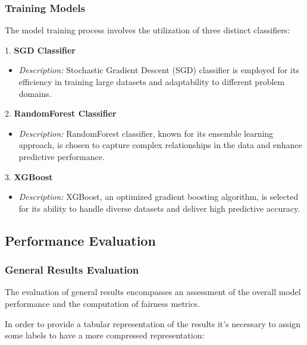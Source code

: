 \subsubsection{Training Models}

The model training process involves the utilization of three distinct classifiers:

1. \textbf{SGD Classifier}
   \begin{itemize}
       \item \textit{Description:} Stochastic Gradient Descent (SGD) classifier is employed for its efficiency in training large datasets and adaptability to different problem domains.
   \end{itemize}

2. \textbf{RandomForest Classifier}
   \begin{itemize}
       \item \textit{Description:} RandomForest classifier, known for its ensemble learning approach, is chosen to capture complex relationships in the data and enhance predictive performance.
   \end{itemize}

3. \textbf{XGBoost}
   \begin{itemize}
       \item \textit{Description:} XGBoost, an optimized gradient boosting algorithm, is selected for its ability to handle diverse datasets and deliver high predictive accuracy.
   \end{itemize}

\subsection{Performance Evaluation}

\subsubsection{General Results Evaluation}

The evaluation of general results encompasses an assessment of the overall model performance and the computation of fairness metrics.

In order to provide a tabular representation of the results it's necessary to assign some labels to have a more compressed representation:

